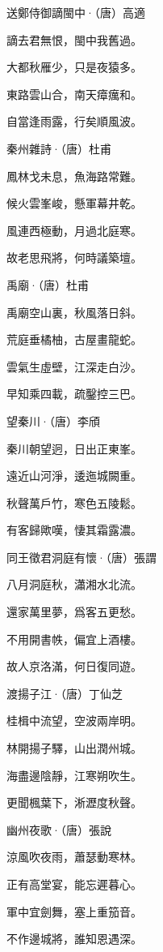 \documentclass[12pt,a4paper]{ctexbook}
\begin{document}
送鄭侍御謫閩中·（唐）高適\par
謫去君無恨，閩中我舊過。\par
大都秋雁少，只是夜猿多。\par
東路雲山合，南天瘴癘和。\par
自當逢雨露，行矣順風波。\par
秦州雜詩·（唐）杜甫\par
鳳林戈未息，魚海路常難。\par
候火雲峯峻，懸軍幕井乾。\par
風連西極動，月過北庭寒。\par
故老思飛將，何時議築壇。\par
禹廟·（唐）杜甫\par
禹廟空山裏，秋風落日斜。\par
荒庭垂橘柚，古屋畫龍蛇。\par
雲氣生虛壁，江深走白沙。\par
早知乘四載，疏鑿控三巴。\par
望秦川·（唐）李頎\par
秦川朝望迥，日出正東峯。\par
遠近山河淨，逶迤城闕重。\par
秋聲萬戶竹，寒色五陵鬆。\par
有客歸歟嘆，悽其霜露濃。\par
同王徵君洞庭有懷·（唐）張謂\par
八月洞庭秋，瀟湘水北流。\par
還家萬里夢，爲客五更愁。\par
不用開書帙，偏宜上酒樓。\par
故人京洛滿，何日復同遊。\par
渡揚子江·（唐）丁仙芝\par
桂楫中流望，空波兩岸明。\par
林開揚子驛，山出潤州城。\par
海盡邊陰靜，江寒朔吹生。\par
更聞楓葉下，淅瀝度秋聲。\par
幽州夜歌·（唐）張說\par
涼風吹夜雨，蕭瑟動寒林。\par
正有高堂宴，能忘遲暮心。\par
軍中宜劍舞，塞上重笳音。\par
不作邊城將，誰知恩遇深。\par
\end{document}
